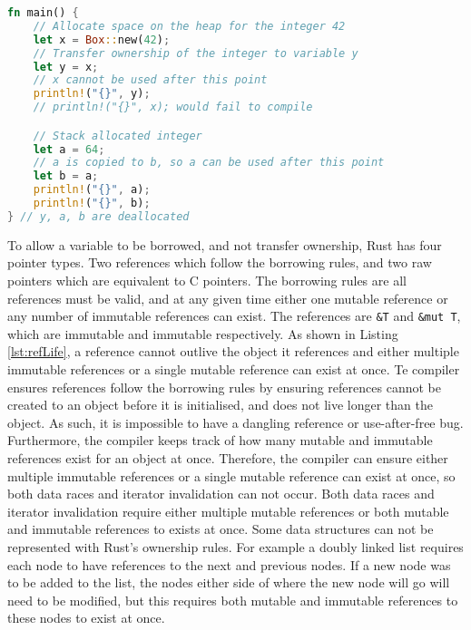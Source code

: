 \documentclass[10pt,a4paper,twocolumn]{article}
\begin{document}
\begin{lstlisting}[language=Rust, float=h, label=lst:owner, caption={A short example of how there
	can be only one owner of a value in Rust.}]
fn main() {
	// Allocate space on the heap for the integer 42
	let x = Box::new(42);
	// Transfer ownership of the integer to variable y
	let y = x;
	// x cannot be used after this point
	println!("{}", y);
	// println!("{}", x); would fail to compile

	// Stack allocated integer
	let a = 64;
	// a is copied to b, so a can be used after this point
	let b = a;
	println!("{}", a);
	println!("{}", b);
} // y, a, b are deallocated
\end{lstlisting}

To allow a variable to be borrowed, and not transfer ownership, Rust has four pointer types.
Two references which follow the borrowing rules, and two raw pointers which are equivalent to C
pointers.
The borrowing rules are all references must be valid, and at any given time either one mutable
reference or any number of immutable references can exist.
The references are \lstinline{&T} and \lstinline{&mut T}, which are immutable and immutable
respectively.
As shown in Listing \ref{lst:refLife}, a reference cannot outlive the object it references and
either multiple immutable references or a single mutable reference can exist at once.
Te compiler ensures references follow the borrowing rules by ensuring references cannot be created
to an object before it is initialised, and does not live longer than the object.
As such, it is impossible to have a dangling reference or use-after-free bug.
Furthermore, the compiler keeps track of how many mutable and immutable references exist for an
object at once.
Therefore, the compiler can ensure either multiple immutable references or a single mutable
reference can exist at once, so both data races and iterator invalidation can not occur.
Both data races and iterator invalidation require either multiple mutable references or both
mutable and immutable references to exists at once.
Some data structures can not be represented with Rust's ownership rules.
For example a doubly linked list requires each node to have references to the next and previous
nodes.
If a new node was to be added to the list, the nodes either side of where the new node will go
will need to be modified, but this requires both mutable and immutable references to these nodes
to exist at once.
\end{document}
